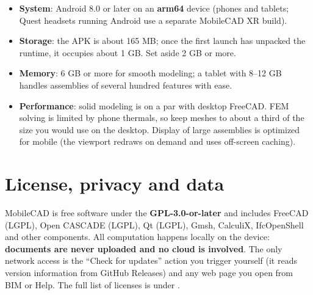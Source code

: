 \begin{itemize}
  \item \textbf{System}: Android 8.0 or later on an \textbf{arm64} device (phones and tablets; Quest headsets
        running Android use a separate MobileCAD XR build).
  \item \textbf{Storage}: the APK is about 165 MB; once the first launch has unpacked the runtime, it occupies
        about 1 GB. Set aside 2 GB or more.
  \item \textbf{Memory}: 6 GB or more for smooth modeling; a tablet with 8--12 GB handles assemblies of
        several hundred features with ease.
  \item \textbf{Performance}: solid modeling is on a par with desktop FreeCAD. FEM solving is limited by phone
        thermals, so keep meshes to about a third of the size you would use on the desktop. Display of large
        assemblies is optimized for mobile (the viewport redraws on demand and uses off-screen caching).
\end{itemize}

\section{License, privacy and data}

MobileCAD is free software under the \textbf{GPL-3.0-or-later} and includes FreeCAD (LGPL), Open CASCADE
(LGPL), Qt (LGPL), Gmsh, CalculiX, IfcOpenShell and other components. All computation happens locally on the
device: \textbf{documents are never uploaded and no cloud is involved}. The only network access is the
“Check for updates” action you trigger yourself (it reads version information from GitHub Releases) and any
web page you open from BIM or Help. The full list of licenses is under
.
